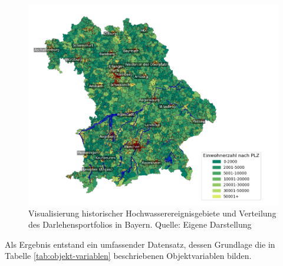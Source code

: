 \begin{figure}[htbp]
    \centering
    \includegraphics[width=1.2\textwidth]{figures/bayern_flut.png} 
    \caption{Visualisierung historischer Hochwasserereignisgebiete und Verteilung des Darlehensportfolios in Bayern. Quelle: Eigene Darstellung}
    \label{fig:bayernflut}
\end{figure}
\FloatBarrier
\clearpage
Als Ergebnis entstand ein umfassender Datensatz, dessen Grundlage die in Tabelle \ref{tab:objekt-variablen} beschriebenen Objektvariablen bilden.
